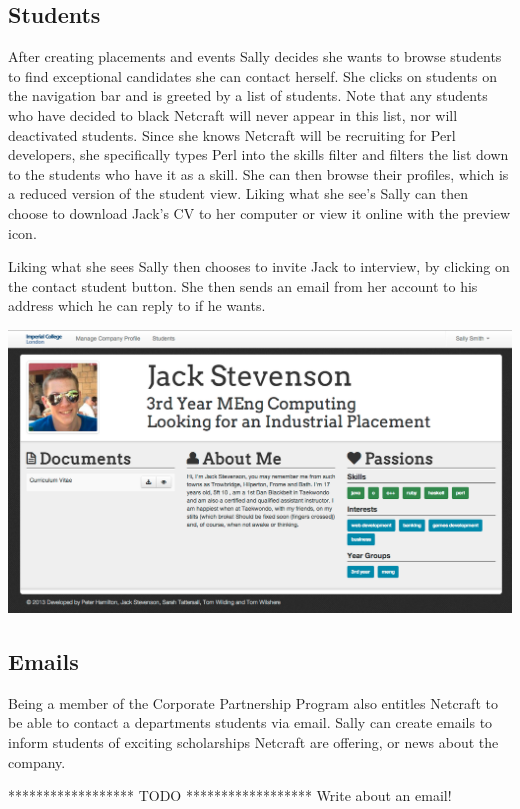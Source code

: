   \subsection{Students}
    After creating placements and events Sally decides she wants to browse students to find exceptional candidates she can contact herself. She clicks on students on the navigation bar and is greeted by a list of students. Note that any students who have decided to black Netcraft will never appear in this list, nor will deactivated students.
    Since she knows Netcraft will be recruiting for Perl developers, she specifically types Perl into the skills filter
    and filters the list down to the students who have it as a skill.
    She can then browse their profiles, which is a reduced version of the student view. Liking what she see's Sally can then choose to download Jack's CV to her computer or view it online with the preview icon. 

    Liking what she sees Sally then chooses to invite Jack to interview, by clicking on the contact student button. She then sends an email from her account to his address which he can reply to if he wants. 

    \includegraphics[scale=0.3]{images/user_experiences/company/jack_profile}

  \subsection{Emails}
    Being a member of the Corporate Partnership Program also entitles Netcraft to be able to contact a departments students via email. Sally can create emails to inform students of exciting scholarships Netcraft are offering, or news about the company.

    ****************** TODO ******************
    Write about an email!

